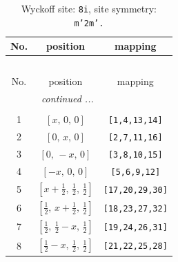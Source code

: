 \documentclass[fleqn,8pt]{jsarticle}
\begin{document}
\begin{longtable}{ccc}
\caption{Wyckoff site: {\tt 8i}, site symmetry: {\tt m'2m'.}}
 \\
 \hline \hline
No. & position & mapping \\ \hline \endfirsthead

\multicolumn{2}{l}{\tablename\ \thetable{}} \\
 \hline \hline
No. & position & mapping \\ \hline \endhead

 \hline \hline
\multicolumn{2}{r}{\footnotesize\it continued ...} \\ \endfoot

 \hline \hline
\multicolumn{2}{r}{} \\ \endlastfoot

1 & $\left[ x,\, 0,\, 0 \right]$ & {\tt [1,4,13,14]} \\ \hline
2 & $\left[ 0,\, x,\, 0 \right]$ & {\tt [2,7,11,16]} \\ \hline
3 & $\left[ 0,\, - x,\, 0 \right]$ & {\tt [3,8,10,15]} \\ \hline
4 & $\left[ - x,\, 0,\, 0 \right]$ & {\tt [5,6,9,12]} \\ \hline
5 & $\left[ x + \frac{1}{2},\, \frac{1}{2},\, \frac{1}{2} \right]$ & {\tt [17,20,29,30]} \\ \hline
6 & $\left[ \frac{1}{2},\, x + \frac{1}{2},\, \frac{1}{2} \right]$ & {\tt [18,23,27,32]} \\ \hline
7 & $\left[ \frac{1}{2},\, \frac{1}{2} - x,\, \frac{1}{2} \right]$ & {\tt [19,24,26,31]} \\ \hline
8 & $\left[ \frac{1}{2} - x,\, \frac{1}{2},\, \frac{1}{2} \right]$ & {\tt [21,22,25,28]} \\
\end{longtable}
\renewcommand{\arraystretch}{1.2}
\end{document}
